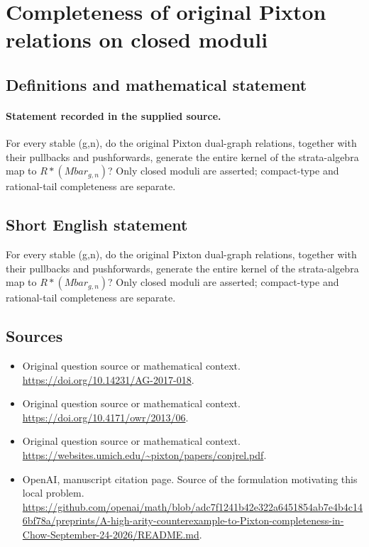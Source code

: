 \documentclass[11pt]{article}
\begin{document}
\section*{Completeness of original Pixton relations on closed moduli}\label{statement}
\subsection{Definitions and mathematical statement}
\paragraph{Statement recorded in the supplied source.}
For every stable (g,n), do the original Pixton dual-graph relations, together with their pullbacks and pushforwards, generate the entire kernel of the strata-algebra map to $R*(Mbar_{g,n})$? Only closed moduli are asserted; compact-type and rational-tail completeness are separate.
\subsection{Short English statement}
For every stable (g,n), do the original Pixton dual-graph relations, together with their pullbacks and pushforwards, generate the entire kernel of the strata-algebra map to $R*(Mbar_{g,n})$? Only closed moduli are asserted; compact-type and rational-tail completeness are separate.
\subsection{Sources}
\begin{itemize}
\item[S1] Original question source or mathematical context.
\url{https://doi.org/10.14231/AG-2017-018}.
\item[S2] Original question source or mathematical context.
\url{https://doi.org/10.4171/owr/2013/06}.
\item[S3] Original question source or mathematical context.
\url{https://websites.umich.edu/~pixton/papers/conjrel.pdf}.
\item[S4] OpenAI, manuscript citation page. Source of the formulation motivating this local problem.
\url{https://github.com/openai/math/blob/adc7f1241b42e322a6451854ab7e4b4c146bf78a/preprints/A-high-arity-counterexample-to-Pixton-completeness-in-Chow-September-24-2026/README.md}.
\end{itemize}
\end{document}
